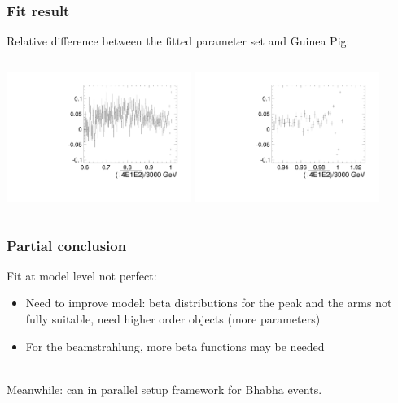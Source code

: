 \documentclass{beamer}
\begin{document}
\begin{frame}
\frametitle{Fit result}\label{slide:fitres}
Relative difference between the fitted parameter set and Guinea Pig:
\begin{columns}[c]
\column{6cm}
\includegraphics[width=6cm]{Relative_diff_Fit_GP.pdf}
\column{6cm}
\includegraphics[width=6cm]{Relative_diff_Fit_GP_zoom.pdf}
\end{columns}
\end{frame}

\begin{frame}
\frametitle{Partial conclusion}
Fit at model level not perfect:
\begin{itemize}
  \item Need to improve model: beta distributions for the peak and the arms not
  fully suitable, need \alert{higher order objects} (more parameters)
  \item For the beamstrahlung, more beta functions may be needed
\end{itemize} 
~\\
Meanwhile: can in parallel setup framework for \alert{Bhabha events}.
\end{frame}
\end{document}
